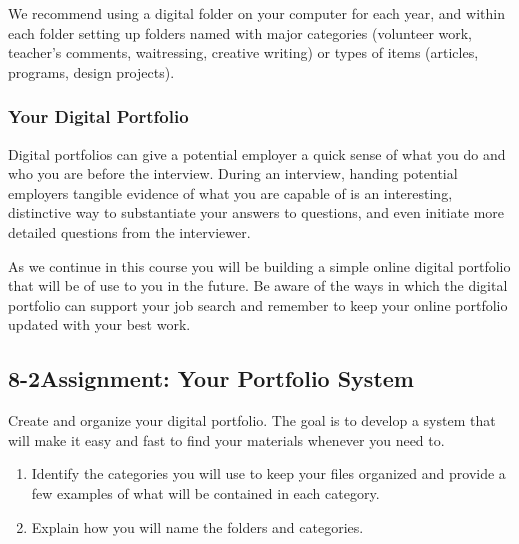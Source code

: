 We recommend using a digital folder on your computer for each year, and within each folder setting up folders named with major categories (volunteer work, teacher's comments, waitressing, creative writing) or types of items (articles, programs, design projects).
\subsubsection*{Your Digital Portfolio}
Digital portfolios can give a potential employer a quick sense of what you do and who you are before the interview. During an interview, handing potential employers tangible evidence of what you are capable of is an interesting, distinctive way to substantiate your answers to questions, and even initiate more detailed questions from the interviewer.

As we continue in this course you will be building a simple online digital portfolio that will be of use to you in the future. Be aware of the ways in which the digital portfolio can support your job search and remember to keep your online portfolio updated with your best work.

\pagebreak \subsection*{8-2\quad Assignment: Your Portfolio System}
Create and organize your digital portfolio. The goal is to develop a system that will make it easy and fast to find your materials whenever you need to.
\begin{enumerate}[leftmargin=*]
\item Identify the categories you will use to keep your files organized and provide a few examples of what will be contained in each category.
\item Explain how you will name the folders and categories.
\end{enumerate}

